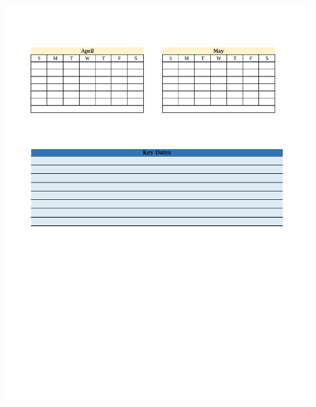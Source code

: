 \begin{mybox}[width=\textwidth]

\includegraphics[width=4.5in,height=7in]{Calendar4.pdf}

\end{mybox}